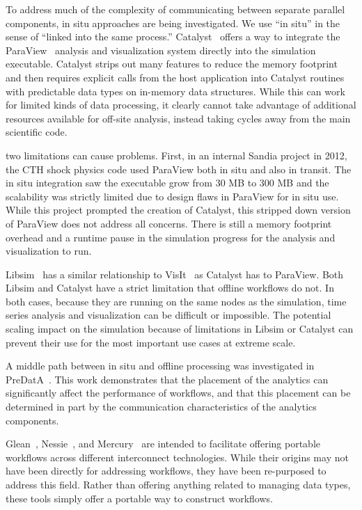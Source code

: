 \documentclass[conference]{IEEEtran}
\begin{document}
To address much of the complexity of communicating between separate parallel
components, in situ approaches are being investigated.
We use ``in situ'' in the sense of ``linked into the same process.''
Catalyst~\cite{karimabadi:2013:catalyst} offers a way to integrate the
ParaView~\cite{Moreland:2008:paraview} analysis and visualization system
directly into the simulation executable. Catalyst strips out many features to
reduce the memory footprint and then requires explicit calls from the host
application into Catalyst routines with predictable data types on in-memory
data structures. While this can work for limited kinds of data processing,
it clearly cannot take advantage of additional resources
available for off-site analysis, instead taking cycles
away from the main scientific code.

two
limitations can cause problems. First, in an internal Sandia project in 2012,
the CTH shock physics code used ParaView both in situ and also in transit. The
in situ integration saw the executable grow from 30 MB to 300 MB and the
scalability was strictly limited due to design flaws in ParaView for in situ
use. While this project prompted the creation of Catalyst, this stripped down
version of ParaView does not address all concerns. There is still a memory
footprint overhead and a runtime pause in the simulation progress for the
analysis and visualization to run.
\fi

Libsim~\cite{whitlock:2011:libsim} has a similar relationship to
VisIt~\cite{Riedel:2007:visit} as Catalyst has to ParaView. Both Libsim and
Catalyst have a strict limitation that offline workflows do not. In both cases,
because they are running on the same nodes as the simulation, time series
analysis and visualization can be difficult or impossible. The potential
scaling impact on the simulation because of limitations in Libsim or Catalyst
can prevent their use for the most important use cases at extreme scale.

A middle path between in situ and offline processing was investigated in
PreDatA~\cite{zheng:2010:predata}.
This work demonstrates that the placement of the analytics can significantly
affect the performance of workflows, and that this placement can be determined
in part by the communication characteristics of the analytics components.

Glean~\cite{vishwanath:2011:glean}, Nessie~\cite{oldfield:lwfs-data-movement},
and Mercury~\cite{Soumagne:2013:mercury} are intended to facilitate offering
portable workflows across different interconnect technologies. While their
origins may not have been directly for addressing workflows, they have been
re-purposed to address this field. Rather than offering anything related to
managing data types, these tools simply offer a portable way to construct
workflows.
\end{document}
